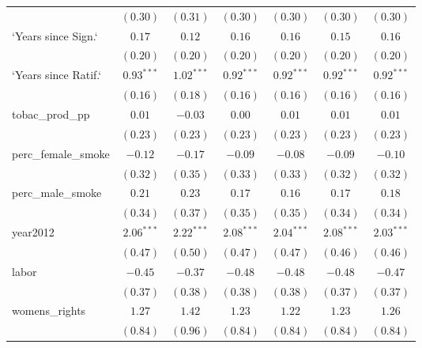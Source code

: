 \begin{table}[!h]
\begin{center}
\begin{tabular}{l c c c c c c }
                        & $(0.30)$     & $(0.31)$     & $(0.30)$     & $(0.30)$     & $(0.30)$     & $(0.30)$     \\
`Years since Sign.`     & $0.17$       & $0.12$       & $0.16$       & $0.16$       & $0.15$       & $0.16$       \\
                        & $(0.20)$     & $(0.20)$     & $(0.20)$     & $(0.20)$     & $(0.20)$     & $(0.20)$     \\
`Years since Ratif.`    & $0.93^{***}$ & $1.02^{***}$ & $0.92^{***}$ & $0.92^{***}$ & $0.92^{***}$ & $0.92^{***}$ \\
                        & $(0.16)$     & $(0.18)$     & $(0.16)$     & $(0.16)$     & $(0.16)$     & $(0.16)$     \\
tobac\_prod\_pp         & $0.01$       & $-0.03$      & $0.00$       & $0.01$       & $0.01$       & $0.01$       \\
                        & $(0.23)$     & $(0.23)$     & $(0.23)$     & $(0.23)$     & $(0.23)$     & $(0.23)$     \\
perc\_female\_smoke     & $-0.12$      & $-0.17$      & $-0.09$      & $-0.08$      & $-0.09$      & $-0.10$      \\
                        & $(0.32)$     & $(0.35)$     & $(0.33)$     & $(0.33)$     & $(0.32)$     & $(0.32)$     \\
perc\_male\_smoke       & $0.21$       & $0.23$       & $0.17$       & $0.16$       & $0.17$       & $0.18$       \\
                        & $(0.34)$     & $(0.37)$     & $(0.35)$     & $(0.35)$     & $(0.34)$     & $(0.34)$     \\
year2012                & $2.06^{***}$ & $2.22^{***}$ & $2.08^{***}$ & $2.04^{***}$ & $2.08^{***}$ & $2.03^{***}$ \\
                        & $(0.47)$     & $(0.50)$     & $(0.47)$     & $(0.47)$     & $(0.46)$     & $(0.46)$     \\
labor                   & $-0.45$      & $-0.37$      & $-0.48$      & $-0.48$      & $-0.48$      & $-0.47$      \\
                        & $(0.37)$     & $(0.38)$     & $(0.38)$     & $(0.38)$     & $(0.37)$     & $(0.37)$     \\
womens\_rights          & $1.27$       & $1.42$       & $1.23$       & $1.22$       & $1.23$       & $1.26$       \\
                        & $(0.84)$     & $(0.96)$     & $(0.84)$     & $(0.84)$     & $(0.84)$     & $(0.84)$     \\

\end{tabular}
\end{center}
\end{table}
